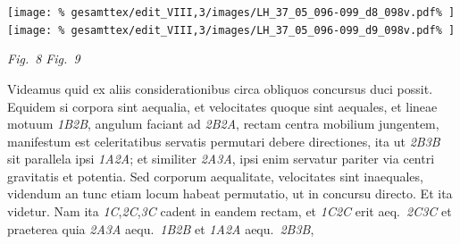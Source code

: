 \centerline{%
\hfill
\texttt{[image: \%
gesamttex/edit\_VIII,3/images/LH\_37\_05\_096-099\_d8\_098v.pdf\%
]}%
\hfill%
\texttt{[image: \%
gesamttex/edit\_VIII,3/images/LH\_37\_05\_096-099\_d9\_098v.pdf\%
]}
\hfill%
} 
\vspace{0.5em}
\centerline{%
\hfill
\lbrack\textit{Fig.~8}\rbrack \hspace*{45mm}
\lbrack\textit{Fig.~9}\rbrack
\hfill%
}
\vspace{1.5em}
%
%
\pstart
 Videamus
%
quid ex aliis considerationibus circa obliquos concursus\protect{} duci possit. Equidem si corpora sint aequalia,%
\protect{} et velocitates quoque sint aequales,%
\protect{} et lineae motuum\protect{} \textit{{\scriptsize1}B{\scriptsize2}B},
%
 angulum faciant ad \textit{{\scriptsize2}B{\scriptsize2}A}, rectam centra mobilium jungentem,%
\protect{} manifestum est celeritatibus servatis permutari debere directiones, ita ut \textit{{\scriptsize2}B{\scriptsize3}B} sit parallela ipsi \textit{{\scriptsize1}A{\scriptsize2}A}; et similiter \textit{{\scriptsize2}A{\scriptsize3}A}, ipsi  
%
%
enim servatur pariter %
via centri gravitatis\protect{} et %
potentia\protect{}. Sed  
%
 corporum aequalitate, velocitates sint inaequales,%
\protect{} videndum an tunc etiam locum habeat permutatio\protect{}, ut in concursu directo\protect{}. Et ita videtur. Nam ita \textit{{\scriptsize1}C}\lbrack,\rbrack\textit{{\scriptsize2}C},\textit{{\scriptsize3}C} cadent in eandem rectam, et \textit{{\scriptsize1}C{\scriptsize2}C} erit aeq.\ \textit{{\scriptsize2}C{\scriptsize3}C} et praeterea quia \textit{{\scriptsize2}A{\scriptsize3}A} aequ.\ \textit{{\scriptsize1}B{\scriptsize2}B} et \textit{{\scriptsize1}A{\scriptsize2}A} aequ.\ \textit{{\scriptsize2}B{\scriptsize3}B},  
